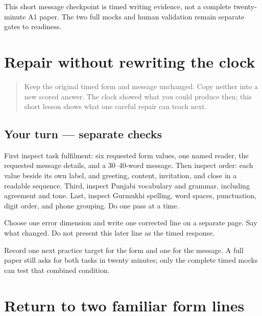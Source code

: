 \begin{tcolorbox}[breakable,colback=teal!4,colframe=teal!35!black,title={Before you move on}]
This short message checkpoint is timed writing evidence, not a complete twenty-minute A1 paper. The two full mocks and human validation remain separate gates to readiness.
\end{tcolorbox}
\section[(repair after the short clocks)]{Repair without rewriting the clock}

\label{lesson:PA-W13-timed-repair}



\begin{quote}
Keep the original timed form and message unchanged. Copy neither into a new scored answer. The clock showed what you could produce then; this short lesson shows what one careful repair can teach next.
\end{quote}

\subsection*{Your turn — separate checks}
First inspect task fulfilment: six requested form values, one named reader, the requested message details, and a 30–40-word message. Then inspect order: each value beside its own label, and greeting, content, invitation, and close in a readable sequence. Third, inspect Punjabi vocabulary and grammar, including agreement and tone. Last, inspect Gurmukhi spelling, word spaces, punctuation, digit order, and phone grouping. Do one pass at a time.

Choose one error dimension and write one corrected line on a separate page. Say what changed. Do not present this later line as the timed response.

\begin{tcolorbox}[breakable,colback=teal!4,colframe=teal!35!black,title={Before you move on}]
Record one next practice target for the form and one for the message. A full paper still asks for both tasks in twenty minutes; only the complete timed mocks can test that combined condition.
\end{tcolorbox}
\section[\texorpdfstring{\pa{ਨਾਂ}: · \pa{ਭਾਸ਼ਾ}: (a short return …)}{ਨਾਂ: · ਭਾਸ਼ਾ: (a short return …)}]{Return to two familiar form lines}

